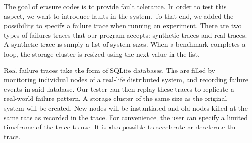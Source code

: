 The goal of erasure codes is to provide fault tolerance.
In order to test this aspect, we want to introduce faults in the system.
To that end, we added the possibility to specify a failure trace when running an experiment.
There are two types of failures traces that our program accepts: synthetic traces and real traces.
A synthetic trace is simply a list of system sizes.
When a benchmark completes a loop, the storage cluster is resized using the next value in the list.

Real failure traces take the form of SQLite databases.
The are filled by monitoring individual nodes of a real-life distributed system, and recording failure events in said database.
Our tester can then replay these traces to replicate a real-world failure pattern.
A storage cluster of the same size as the original system will be created.
New nodes will be instantiated and old nodes killed at the same rate as recorded in the trace.
For convenience, the user can specify a limited timeframe of the trace to use.
It is also possible to accelerate or decelerate the trace.
